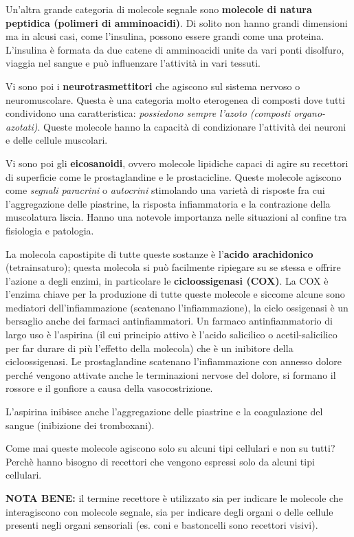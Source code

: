 \documentclass[]{article}
\begin{document}
Un'altra grande categoria di molecole segnale sono \textbf{molecole di
natura peptidica (polimeri di amminoacidi)}. Di solito non hanno grandi
dimensioni ma in alcusi casi, come l'insulina, possono essere grandi
come una proteina. L'insulina è formata da due catene di amminoacidi
unite da vari ponti disolfuro, viaggia nel sangue e può influenzare
l'attività in vari tessuti.

Vi sono poi i \textbf{neurotrasmettitori} che agiscono sul sistema
nervoso o neuromuscolare. Questa è una categoria molto eterogenea di
composti dove tutti condividono una caratteristica: \emph{possiedono
sempre l'azoto (composti organo-azotati)}. Queste molecole hanno la
capacità di condizionare l'attività dei neuroni e delle cellule
muscolari.

Vi sono poi gli \textbf{eicosanoidi}, ovvero molecole lipidiche capaci
di agire su recettori di superficie come le prostaglandine e le
prostacicline. Queste molecole agiscono come \emph{segnali paracrini} o
\emph{autocrini} stimolando una varietà di risposte fra cui
l'aggregazione delle piastrine, la risposta infiammatoria e la
contrazione della muscolatura liscia. Hanno una notevole importanza
nelle situazioni al confine tra fisiologia e patologia.

La molecola capostipite di tutte queste sostanze è l'\textbf{acido
arachidonico} (tetrainsaturo); questa molecola si può facilmente
ripiegare su se stessa e offrire l'azione a degli enzimi, in particolare
le \textbf{cicloossigenasi (COX)}. La COX è l'enzima chiave per la
produzione di tutte queste molecole e siccome alcune sono mediatori
dell'infiammazione (scatenano l'infiammazione), la ciclo ossigenasi è un
bersaglio anche dei farmaci antinfiammatori. Un farmaco antinfiammatorio
di largo uso è l'aspirina (il cui principio attivo è l'acido salicilico
o acetil-salicilico per far durare di più l'effetto della molecola) che
è un inibitore della cicloossigenasi. Le prostaglandine scatenano
l'infiammazione con annesso dolore perché vengono attivate anche le
terminazioni nervose del dolore, si formano il rossore e il gonfiore a
causa della vasocostrizione.

L'aspirina inibisce anche l'aggregazione delle piastrine e la
coagulazione del sangue (inibizione dei tromboxani).

Come mai queste molecole agiscono solo su alcuni tipi cellulari e non su
tutti? Perchè hanno bisogno di recettori che vengono espressi solo da
alcuni tipi cellulari.

\textbf{NOTA BENE:} il termine recettore è utilizzato sia per indicare
le molecole che interagiscono con molecole segnale, sia per indicare
degli organi o delle cellule presenti negli organi sensoriali (es. coni
e bastoncelli sono recettori visivi).
\end{document}
